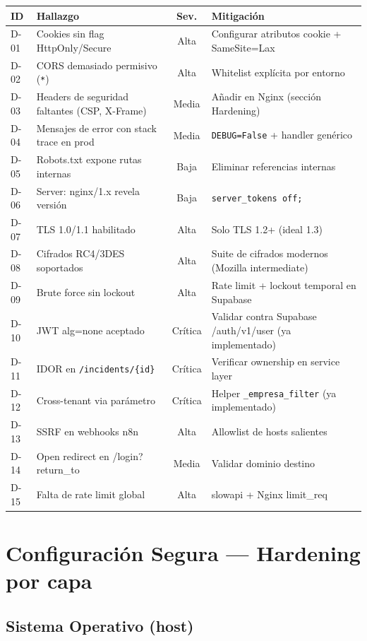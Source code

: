 \documentclass[12pt,a4paper,oneside]{article}
\begin{document}
\begin{longtable}{p{1cm}p{4cm}cp{6cm}}
\toprule
\textbf{ID} & \textbf{Hallazgo} & \textbf{Sev.} & \textbf{Mitigación} \\
\midrule
\endhead
D-01 & Cookies sin flag HttpOnly/Secure & Alta & Configurar atributos cookie + SameSite=Lax \\
D-02 & CORS demasiado permisivo (\texttt{*}) & Alta & Whitelist explícita por entorno \\
D-03 & Headers de seguridad faltantes (CSP, X-Frame) & Media & Añadir en Nginx (sección Hardening) \\
D-04 & Mensajes de error con stack trace en prod & Media & \texttt{DEBUG=False} + handler genérico \\
D-05 & Robots.txt expone rutas internas & Baja & Eliminar referencias internas \\
D-06 & Server: nginx/1.x revela versión & Baja & \texttt{server\_tokens off;} \\
D-07 & TLS 1.0/1.1 habilitado & Alta & Solo TLS 1.2+ (ideal 1.3) \\
D-08 & Cifrados RC4/3DES soportados & Alta & Suite de cifrados modernos (Mozilla intermediate) \\
D-09 & Brute force sin lockout & Alta & Rate limit + lockout temporal en Supabase \\
D-10 & JWT alg=none aceptado & Crítica & Validar contra Supabase /auth/v1/user (ya implementado) \\
D-11 & IDOR en \texttt{/incidents/\{id\}} & Crítica & Verificar ownership en service layer \\
D-12 & Cross-tenant via parámetro & Crítica & Helper \texttt{\_empresa\_filter} (ya implementado) \\
D-13 & SSRF en webhooks n8n & Alta & Allowlist de hosts salientes \\
D-14 & Open redirect en /login?return\_to & Media & Validar dominio destino \\
D-15 & Falta de rate limit global & Alta & slowapi + Nginx limit\_req \\
\bottomrule
\end{longtable}

\section{Configuración Segura — Hardening por capa}

\subsection{Sistema Operativo (host)}
\end{document}
